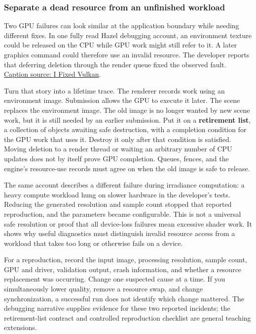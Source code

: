 \subsubsection{Separate a dead resource from an unfinished workload}\label{06-engine-ii-ch026-separate-a-dead-resource-from-an-unfinished-workload}

Two GPU failures can look similar at the application boundary while needing different fixes. In one fully read Hazel debugging account, an environment texture could be released on the CPU while GPU work might still refer to it. A later graphics command could therefore use an invalid resource. The developer reports that deferring deletion through the render queue fixed the observed fault. \href{https://www.youtube.com/watch?v=EXgXMa5kapI}{Caption source: I Fixed Vulkan}.

Turn that story into a lifetime trace. The renderer records work using an environment image. Submission allows the GPU to execute it later. The scene replaces the environment image. The old image is no longer wanted by new scene work, but it is still needed by an earlier submission. Put it on a \textbf{retirement list}, a collection of objects awaiting safe destruction, with a completion condition for the GPU work that uses it. Destroy it only after that condition is satisfied. Moving deletion to a render thread or waiting an arbitrary number of CPU updates does not by itself prove GPU completion. Queues, fences, and the engine's resource-use records must agree on when the old image is safe to release.

The same account describes a different failure during irradiance computation: a heavy compute workload hung on slower hardware in the developer's tests. Reducing the generated resolution and sample count stopped that reported reproduction, and the parameters became configurable. This is not a universal safe resolution or proof that all device-loss failures mean excessive shader work. It shows why useful diagnostics must distinguish invalid resource access from a workload that takes too long or otherwise fails on a device.

For a reproduction, record the input image, processing resolution, sample count, GPU and driver, validation output, crash information, and whether a resource replacement was occurring. Change one suspected cause at a time. If you simultaneously lower quality, remove a resource swap, and change synchronization, a successful run does not identify which change mattered. The debugging narrative supplies evidence for these two reported incidents; the retirement-list contract and controlled reproduction checklist are general teaching extensions.

